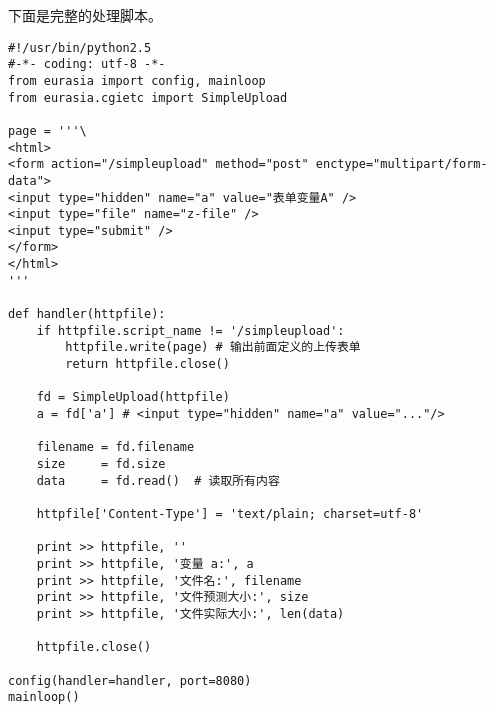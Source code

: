 \documentclass{manual}
\begin{document}
下面是完整的处理脚本。

\begin{verbatim}
#!/usr/bin/python2.5
#-*- coding: utf-8 -*-
from eurasia import config, mainloop
from eurasia.cgietc import SimpleUpload

page = '''\
<html>
<form action="/simpleupload" method="post" enctype="multipart/form-data">
<input type="hidden" name="a" value="表单变量A" />
<input type="file" name="z-file" />
<input type="submit" />
</form>
</html>
'''

def handler(httpfile):
	if httpfile.script_name != '/simpleupload':
		httpfile.write(page) # 输出前面定义的上传表单
		return httpfile.close()

	fd = SimpleUpload(httpfile)
	a = fd['a'] # <input type="hidden" name="a" value="..."/>

	filename = fd.filename
	size     = fd.size
	data     = fd.read()  # 读取所有内容

	httpfile['Content-Type'] = 'text/plain; charset=utf-8'

	print >> httpfile, ''
	print >> httpfile, '变量 a:', a
	print >> httpfile, '文件名:', filename
	print >> httpfile, '文件预测大小:', size
	print >> httpfile, '文件实际大小:', len(data)

	httpfile.close()

config(handler=handler, port=8080)
mainloop()
\end{verbatim}




\end{document}
